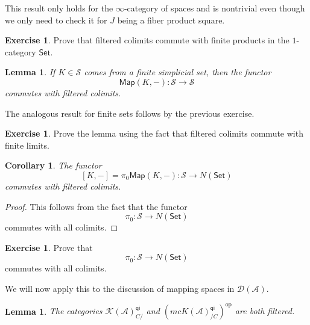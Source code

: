 \documentclass[10pt, oneside]{memoir}
\newtheorem{cor}[thm]{Corollary}
\newtheorem{lem}[thm]{Lemma}
\theoremstyle{definition}
\newtheorem{exer}[thm]{Exercise}
\theoremstyle{remark}
\theoremstyle{plain}
\theoremstyle{definition}
\theoremstyle{remark}
\newcommand{\mc}[1]{\mathcal{#1}}
\newcommand{\ms}[1]{\mathsf{#1}}
\newcommand{\1}{\mathbf{1}}
\newcommand{\2}{\mathbf{2}}
\newcommand{\3}{\mathbf{3}}
\DeclareMathOperator{\op}{op}
\begin{document}
This result only holds for the \(\infty \)-category of spaces and is nontrivial even though we only need to check it for \(J \) being a fiber product square.

\begin{exer}
    Prove that filtered colimits commute with finite products in the \(1 \)-category \(\ms{Set} \).
\end{exer}

\begin{lem}
    If \(K \in \mc{S} \) comes from a finite simplicial set, then the functor
    \[ \ms{Map}(K, -) \colon \mc{S} \to \mc{S} \]
    commutes with filtered colimits.
\end{lem}

The analogous result for finite sets follows by the previous exercise.

\begin{exer}
    Prove the lemma using the fact that filtered colimits commute with finite limits.
\end{exer}

\begin{cor}
    The functor
    \[ [K,-] = \pi_0 \ms{Map}(K, -) \colon \mc{S} \to N(\ms{Set}) \]
    commutes with filtered colimits.
\end{cor}

\begin{proof}
    This follows from the fact that the functor
    \[ \pi_0 \colon \mc{S} \to N(\ms{Set}) \]
    commutes with all colimits.
\end{proof}

\begin{exer}
    Prove that
    \[ \pi_0 \colon \mc{S} \to N(\ms{Set}) \]
    commutes with all colimits.
\end{exer}

We will now apply this to the discussion of mapping spaces in \(\mc{D}(\mc{A}) \).

\begin{lem}
    The categories \(\mc{K}(\mc{A})_{C/}^{\ms{qi}} \) and \((mc{K}(\mc{A})_{/C}^{\ms{qi}})^{\op} \) are both filtered.
\end{lem}
\end{document}
